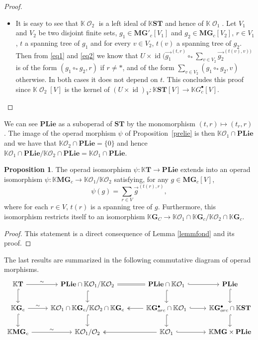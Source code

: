 \documentclass[a4paper]{article}
\DeclareMathOperator{\id}{id}
\DeclareMathOperator{\op}{\mathcal{O}}
\theoremstyle{definition}
\newtheorem{proposition}[definition]{Proposition}
\newcommand{\K}{\mathbb{K}}
\newcommand{\Operad}{\mathcal{O}}
\newcommand{\PLie}{\mathbf{PLie}}
\newcommand{\MG}{\mathbf{MG}}
\newcommand{\G}{\mathbf{G}}
\newcommand{\T}{\mathbf{T}}
\newcommand{\ST}{\mathbf{ST}}
\begin{document}
\begin{proof}
\begin{itemize}
	\item It is easy to see that $\K\op_2$ is a left ideal of $\K \ST$ and hence of $\K\op_1$. 
	Let $V_1$ and $V_2$ be two disjoint finite sets, $g_1\in \MG'_c[V_1]$ and 
	$g_2\in \MG_c[V_2]$, $r\in V_1$, $t$ a spanning tree of $g_1$ and for every $v\in V_2$, $t(v)$ 
	a spanning tree of $g_2$. Then from \ref{eq1} and \ref{eq2} we know that 
	$U\times\id(\overrightarrow{g_1}^{(t,r)}\circ_{\ast}\sum_{v\in V_2} \overrightarrow{g_2}^{(t(v),v))}$ 
	is of the form $(g_1\circ_{\ast} g_2, r)$ if $r\not = \ast$, and of the form 
	$\sum_{v\in V_2} (g_1\circ_{\ast} g_2, v)$ otherwise. In both cases it does not depend on $t$.
	 This concludes this proof since $\K \op_2[V]$ is the kernel of $(U\times\id)_V: \K \ST[V]\rightarrow \K G_c^{\bullet}[V]$.
\end{itemize}
\end{proof}

We can see $\PLie$ as a suboperad of $\ST$ by the monomorphism
$(t,r)\mapsto (t_r,r)$. The image of the operad morphism $\psi$ of Proposition~\ref{prelie} is
then $\K\Operad_1\cap \PLie$ and we have that $\K\Operad_2\cap \PLie = \{0\}$ and hence
$\K\Operad_1\cap \PLie/\K\Operad_2\cap \PLie = \K\Operad_1\cap \PLie$.


\begin{proposition}
The operad isomorphism $\psi: \K \T \to \PLie$
extends into an operad isomorphism $\psi: \K \MG_c \to \K\Operad_1/\K\Operad_2$ satisfying,
for any $g \in \MG_c[V]$,
\begin{equation}
    \psi(g) = \sum_{r\in V}\overrightarrow{g}^{(t(r),r)},
\end{equation}
where for each $r\in V$, $t(r)$ is a spanning tree of $g$. Furthermore, this isomorphism
restricts itself to an isomorphism $\K\G_C \to \K\Operad_1\cap\K\G_c/\K\Operad_2\cap\K\G_c$.
\end{proposition}

\begin{proof}
This statement is a direct consequence of Lemma \ref{lemmfond} and its proof.
\end{proof}

The last results are summarized in the following commutative diagram of operad morphisms.
\begin{equation}
\begin{tikzcd}
    \K \T \arrow[r, "\sim"] \arrow[d, hook]
    & \PLie\cap\K\Operad_1/\K\Operad_2 \arrow[r, equal] \arrow[d, hook]
    & \PLie\cap\K\Operad_1 \arrow[d,hook] \arrow[r, hook]
    & \PLie \arrow[d,hook]\\
    \K \G_c \arrow[r, "\sim"] \arrow[d, hook]
    & \K\Operad_1\cap\K\G_c/\K\Operad_2\cap\K\G_c \arrow[d, hook]
    & \K\G_{orc}^{\bullet}\cap\K\Operad_1 \arrow[l, two heads] \arrow[r, hook] \arrow[d, hook]
    & \K\G_{orc}^{\bullet}\cap\K \ST \arrow[d, hook] \\
    \K\MG_c \arrow[r, "\sim"]
    & \K\Operad_1/\Operad_2
    & \K\Operad_1 \arrow[l, two heads] \arrow[r, hook]
    & \K\MG\times\PLie
\end{tikzcd}
\end{equation}
\end{document}

